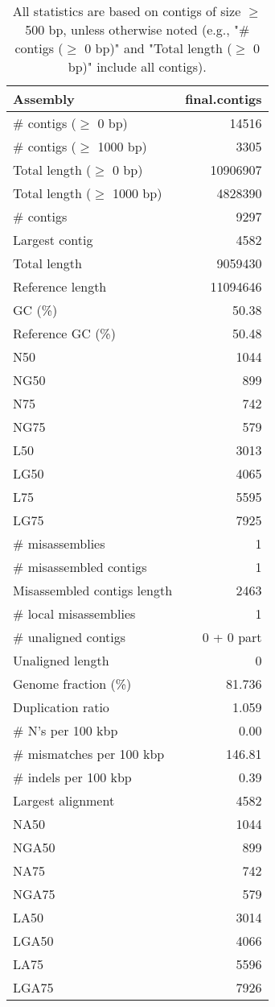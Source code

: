 \documentclass[12pt,a4paper]{article}
\begin{document}
\begin{table}[ht]
\begin{center}
\caption{All statistics are based on contigs of size $\geq$ 500 bp, unless otherwise noted (e.g., "\# contigs ($\geq$ 0 bp)" and "Total length ($\geq$ 0 bp)" include all contigs).}
\begin{tabular}{|l*{1}{|r}|}
\hline
Assembly & final.contigs \\ \hline
\# contigs ($\geq$ 0 bp) & 14516 \\ \hline
\# contigs ($\geq$ 1000 bp) & 3305 \\ \hline
Total length ($\geq$ 0 bp) & 10906907 \\ \hline
Total length ($\geq$ 1000 bp) & 4828390 \\ \hline
\# contigs & 9297 \\ \hline
Largest contig & 4582 \\ \hline
Total length & 9059430 \\ \hline
Reference length & 11094646 \\ \hline
GC (\%) & 50.38 \\ \hline
Reference GC (\%) & 50.48 \\ \hline
N50 & 1044 \\ \hline
NG50 & 899 \\ \hline
N75 & 742 \\ \hline
NG75 & 579 \\ \hline
L50 & 3013 \\ \hline
LG50 & 4065 \\ \hline
L75 & 5595 \\ \hline
LG75 & 7925 \\ \hline
\# misassemblies & 1 \\ \hline
\# misassembled contigs & 1 \\ \hline
Misassembled contigs length & 2463 \\ \hline
\# local misassemblies & 1 \\ \hline
\# unaligned contigs & 0 + 0 part \\ \hline
Unaligned length & 0 \\ \hline
Genome fraction (\%) & 81.736 \\ \hline
Duplication ratio & 1.059 \\ \hline
\# N's per 100 kbp & 0.00 \\ \hline
\# mismatches per 100 kbp & 146.81 \\ \hline
\# indels per 100 kbp & 0.39 \\ \hline
Largest alignment & 4582 \\ \hline
NA50 & 1044 \\ \hline
NGA50 & 899 \\ \hline
NA75 & 742 \\ \hline
NGA75 & 579 \\ \hline
LA50 & 3014 \\ \hline
LGA50 & 4066 \\ \hline
LA75 & 5596 \\ \hline
LGA75 & 7926 \\ \hline
\end{tabular}
\end{center}
\end{table}
\end{document}
